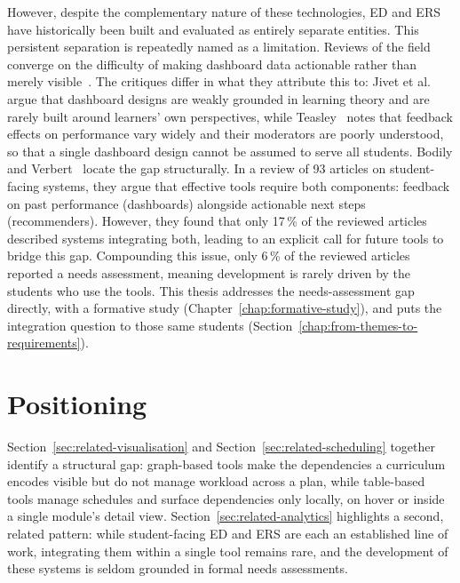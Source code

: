 However, despite the complementary nature of these technologies, ED and ERS have historically been built and evaluated as entirely separate entities. This persistent separation is repeatedly named as a limitation.
Reviews of the field converge on the difficulty of making dashboard data actionable rather than merely visible~\cite{verbert_learning_2020, masiello_current_2024}. The critiques differ in what they attribute this to: Jivet et al.~\cite{jivet_awareness_2017} argue that dashboard designs are weakly grounded in learning theory and are rarely built around learners' own perspectives, while Teasley~\cite{teasley_student_2017} notes that feedback effects on performance vary widely and their moderators are poorly understood, so that a single dashboard design cannot be assumed to serve all students. Bodily and Verbert~\cite{bodily_review_2017} locate the gap structurally. In a review of 93 articles on student-facing systems, they argue that effective tools require both components: feedback on past performance (dashboards) alongside actionable next steps (recommenders). However, they found that only 17\,\% of the reviewed articles described systems integrating both, leading to an explicit call for future tools to bridge this gap. Compounding this issue, only 6\,\% of the reviewed articles reported a needs assessment, meaning development is rarely driven by the students who use the tools. This thesis addresses the needs-assessment gap directly, with a formative study (Chapter~\ref{chap:formative-study}), and puts the integration question to those same students (Section~\ref{chap:from-themes-to-requirements}).

\section{Positioning}
\label{sec:related-gap}
Section~\ref{sec:related-visualisation} and Section~\ref{sec:related-scheduling} together identify a structural gap: graph-based tools make the dependencies a curriculum encodes visible but do not manage workload across a plan, while table-based tools manage schedules and surface dependencies only locally, on hover or inside a single module's detail view.
Section~\ref{sec:related-analytics} highlights a second, related pattern: while student-facing ED and ERS are each an established line of work, integrating them within a single tool remains rare, and the development of these systems is seldom grounded in formal needs assessments.

